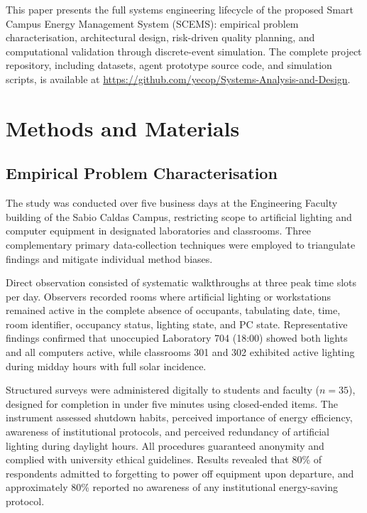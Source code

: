 \documentclass[conference]{IEEEtran}
\begin{document}
This paper presents the full systems engineering lifecycle of the proposed Smart Campus Energy Management System (SCEMS): empirical problem characterisation, architectural design, risk-driven quality planning, and computational validation through discrete-event simulation. The complete project repository, including datasets, agent prototype source code, and simulation scripts, is available at \url{https://github.com/yecop/Systems-Analysis-and-Design}.

\section{Methods and Materials}

\subsection{Empirical Problem Characterisation}

The study was conducted over five business days at the Engineering Faculty building of the Sabio Caldas Campus, restricting scope to artificial lighting and computer equipment in designated laboratories and classrooms. Three complementary primary data-collection techniques were employed to triangulate findings and mitigate individual method biases.

Direct observation consisted of systematic walkthroughs at three peak time slots per day. Observers recorded rooms where artificial lighting or workstations remained active in the complete absence of occupants, tabulating date, time, room identifier, occupancy status, lighting state, and PC state. Representative findings confirmed that unoccupied Laboratory 704 (18:00) showed both lights and all computers active, while classrooms 301 and 302 exhibited active lighting during midday hours with full solar incidence.

Structured surveys were administered digitally to students and faculty ($n=35$), designed for completion in under five minutes using closed-ended items. The instrument assessed shutdown habits, perceived importance of energy efficiency, awareness of institutional protocols, and perceived redundancy of artificial lighting during daylight hours. All procedures guaranteed anonymity and complied with university ethical guidelines. Results revealed that 80\% of respondents admitted to forgetting to power off equipment upon departure, and approximately 80\% reported no awareness of any institutional energy-saving protocol.
\end{document}
